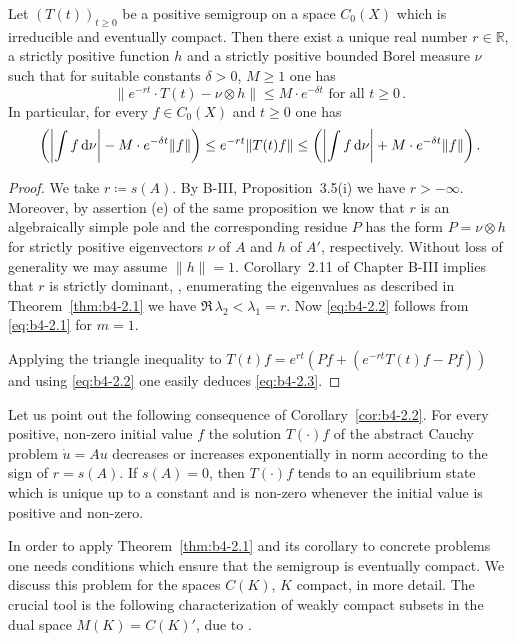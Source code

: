 \begin{corollary}\label{cor:b4-2.2}
	Let $(T(t))_{t \geq 0}$ be a positive semigroup on a space
	$C_{0}(X)$ which is irreducible and eventually compact.
	Then there exist a
	unique real number $r \in \mathbb{R}$, a strictly positive function $h$ and a
	strictly positive bounded Borel measure $\nu$ such that for suitable
	constants $\delta > 0$, $M \geq 1$ one has
	\begin{equation}\label{eq:b4-2.2}
		\|e^{-rt}\cdot T(t) - \nu\otimes h\| \leq M\cdot e^{-\delta t} \text{ for all } t \geq 0\,.
	\end{equation}
	In particular, for every $f \in C_{0}(X)$ and $t \geq 0$ one has
	\begin{equation}\label{eq:b4-2.3}\text{$
		\left(\left|\int f \mathop{}\!\mathrm{d}{\nu}\right| - M\cdot e^{-\delta t}\|f\|\right) \leq e^{-rt}\|T(t)f\| \leq \left(\left|\int f \mathop{}\!\mathrm{d}{\nu}\right| + M\cdot e^{-\delta t}\|f\|\right).$}
	\end{equation}
\end{corollary}
\begin{proof}
	We take $r  \coloneq  s(A)$.
	By B-III, Proposition~3.5(i) we have $r > -\infty$.
	Moreover, by assertion (e) of the same proposition we know that $r$ is
	an algebraically simple pole and the corresponding residue $P$ has the
	form $P = \nu \otimes h$ for strictly positive eigenvectors $\nu$ of $A$
	and $h$ of $A'$, respectively.
	Without loss of generality we may assume
	$\|h\| = 1$.
	Corollary~2.11 of Chapter B-III implies that $r$ is strictly
	dominant, \ie, enumerating the eigenvalues as described in Theorem~\ref{thm:b4-2.1} we
	have $\Re\,\lambda_2 < \lambda_1 = r$.
	Now \eqref{eq:b4-2.2} follows from \eqref{eq:b4-2.1} for $m = 1$.
    
    Applying the triangle inequality to $T(t)f = e^{rt}(Pf + (e^{-rt}T(t)f-Pf))$
    and using \eqref{eq:b4-2.2} one easily deduces \eqref{eq:b4-2.3}.
\end{proof}

Let us point out the following consequence of Corollary~\ref{cor:b4-2.2}.
For every positive, non-zero initial value $f$ the solution $T(\cdot)f$
of the abstract Cauchy problem $\dot{u} = Au$ decreases or increases
exponentially in norm according to the sign of $r = s(A)$.
If $s(A) = 0$, then $T(\cdot)f$ tends to an equilibrium state which is
unique up to a constant and is non-zero whenever the initial value is
positive and non-zero.

In order to apply Theorem~\ref{thm:b4-2.1} and its corollary to concrete problems one
needs conditions which ensure that the semigroup is eventually compact.
We discuss this problem for the spaces $C(K)$, $K$ compact, in
more detail.
The crucial tool is the following characterization of
weakly compact subsets in the dual space $M(K) = C(K)'$, due to
\citet{grothendieck:1953}.

